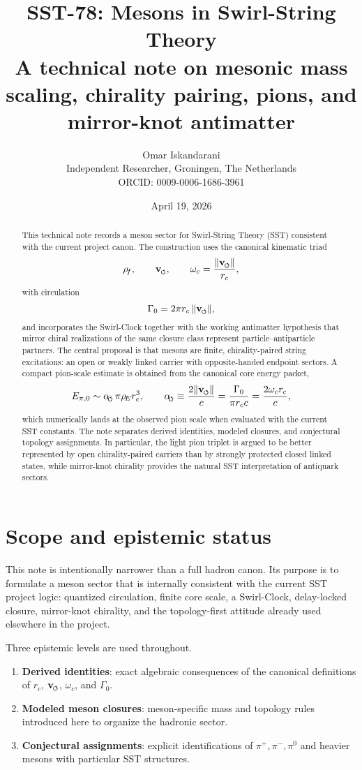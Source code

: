 \documentclass[11pt,a4paper]{article}
\title{SST-78: Mesons in Swirl-String Theory\\
\large A technical note on mesonic mass scaling, chirality pairing, pions, and mirror-knot antimatter}
\author{Omar Iskandarani\\Independent Researcher, Groningen, The Netherlands\\ORCID: 0009-0006-1686-3961}
\date{April 19, 2026}
\newcommand{\swirlarrow}{\mathchoice{\mkern-2mu\scriptstyle\boldsymbol{\circlearrowleft}}{\mkern-2mu\scriptstyle\boldsymbol{\circlearrowleft}}{\mkern-2mu\scriptscriptstyle\boldsymbol{\circlearrowleft}}{\mkern-2mu\scriptscriptstyle\boldsymbol{\circlearrowleft}}}
\newcommand{\vswirl}{\mathbf{v}_{\swirlarrow}}
\newcommand{\rhof}{\rho_{\!f}}
\newcommand{\rhoE}{\rho_{\!E}}
\newcommand{\rc}{r_c}
\newcommand{\Gammazero}{\Gamma_0}
\newcommand{\omegac}{\omega_c}
\newcommand{\alphasw}{\alpha_{\!\swirlarrow}}
\newcommand{\piplus}{\pi^{+}}
\newcommand{\piminus}{\pi^{-}}
\newcommand{\pizero}{\pi^{0}}
\begin{document}
\maketitle

\begin{abstract}
This technical note records a meson sector for Swirl-String Theory (SST) consistent with the current project canon. The construction uses the canonical kinematic triad
\[
\rhof,\qquad \vswirl,\qquad \omegac = \frac{\lVert \vswirl \rVert}{\rc},
\]
with circulation
\[
\Gammazero = 2\pi \rc\,\lVert \vswirl \rVert,
\]
and incorporates the Swirl-Clock together with the working antimatter hypothesis that mirror chiral realizations of the same closure class represent particle--antiparticle partners. The central proposal is that mesons are finite, chirality-paired string excitations: an open or weakly linked carrier with opposite-handed endpoint sectors. A compact pion-scale estimate is obtained from the canonical core energy packet,
\[
E_{\pi,0} \sim \alphasw\,\pi\rhoE \rc^{3},
\qquad
\alphasw \equiv \frac{2\lVert \vswirl \rVert}{c}
= \frac{\Gammazero}{\pi \rc c}
= \frac{2\omegac \rc}{c},
\]
which numerically lands at the observed pion scale when evaluated with the current SST constants. The note separates derived identities, modeled closures, and conjectural topology assignments. In particular, the light pion triplet is argued to be better represented by open chirality-paired carriers than by strongly protected closed linked states, while mirror-knot chirality provides the natural SST interpretation of antiquark sectors.
\end{abstract}

\section{Scope and epistemic status}
This note is intentionally narrower than a full hadron canon. Its purpose is to formulate a meson sector that is internally consistent with the current SST project logic: quantized circulation, finite core scale, a Swirl-Clock, delay-locked closure, mirror-knot chirality, and the topology-first attitude already used elsewhere in the project.

Three epistemic levels are used throughout.
\begin{enumerate}[label=(\roman*)]
    \item \textbf{Derived identities}: exact algebraic consequences of the canonical definitions of \(\rc\), \(\vswirl\), \(\omegac\), and \(\Gammazero\).
    \item \textbf{Modeled meson closures}: meson-specific mass and topology rules introduced here to organize the hadronic sector.
    \item \textbf{Conjectural assignments}: explicit identifications of \(\piplus,\piminus,\pizero\) and heavier mesons with particular SST structures.
\end{enumerate}
\end{document}
